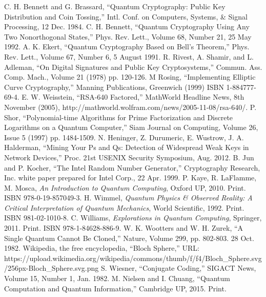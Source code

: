 \documentclass[conference]{IEEEtran}
\begin{document}
\begin{thebibliography}{26}
  C. H. Bennett and G. Brassard, ``Quantum Cryptography: Public Key Distribution and Coin Tossing,'' Intl. Conf. on Computers, Systems, \& Signal Processing, 12 Dec. 1984.
  C. H. Bennett, ``Quantum Cryptography Using Any Two Nonorthogonal States,'' Phys. Rev. Lett., Volume 68, Number 21, 25 May 1992.
  A. K. Ekert, ``Quantum Cryptography Based on Bell's Theorem,'' Phys. Rev. Lett., Volume 67, Number 6, 5 August 1991.
  R. Rivest, A. Shamir, and L. Adleman, ``On Digital Signatures and Public Key Cryptosystems,'' Commun. Ass. Comp. Mach., Volume 21 (1978) pp. 120-126.
  M Rosing, ``Implementing Elliptic Curve Cryptography,'' Manning Publications, Greenwich (1999) ISBN 1-884777-69-4.
  E. W. Weisstein, ``RSA-640 Factored,'' MathWorld Headline News, 8th November (2005),
  http://mathworld.wolfram.com/news/2005-11-08/rsa-640/.
  P. Shor, ``Polynomial-time Algorithms for Prime Factorization and Discrete Logarithms on a Quantum Computer,'' Siam Journal on Computing, Volume 26, Issue 5 (1997) pp. 1484-1509.
  N. Heninger, Z. Durumeric, E. Wustrow, J. A. Halderman, ``Mining Your Ps and Qs: Detection of Widespread Weak Keys in Network Devices,'' Proc. 21st USENIX Security Symposium, Aug. 2012.
  B. Jun and P. Kocher, ``The Intel Random Number Generator,'' Cryptography Research, Inc. white paper prepared for Intel Corp., 22 Apr. 1999.
  P. Kaye, R. LaFlamme, M. Mosca, \textit{An Introduction to Quantum Computing}, Oxford UP, 2010. Print. ISBN 978-0-19-857049-3.
  H. Wimmel, \textit{Quantum Physics \& Observed Reality: A Critical Interpretation of Quantum Mechanics}, World Scientific, 1992. Print. ISBN 981-02-1010-8.
  C. Williams, \textit{Explorations in Quantum Computing}, Springer, 2011. Print. ISBN 978-1-84628-886-9.
  W. K. Wootters and W. H. Zurek, ``A Single Quantum Cannot Be Cloned,'' Nature, Volume 299, pp. 802-803. 28 Oct. 1982.
  Wikipedia, the free encyclopedia, ``Bloch Sphere,''
  URL: https://upload.wikimedia.org/wikipedia/commons/thumb/f/f4/Bloch\_Sphere.svg/256px-Bloch\_Sphere.svg.png
  S. Wiesner, ``Conjugate Coding,'' SIGACT News, Volume 15, Number 1, Jan. 1982.
  M. Nielsen and I. Chuang, ``Quantum Computation and Quantum Information,'' Cambridge UP, 2015. Print.

\end{thebibliography}
\end{document}
